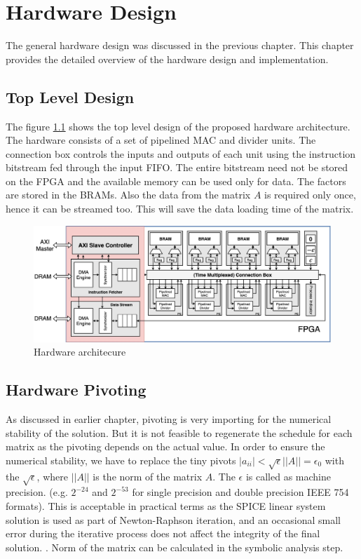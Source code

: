 \chapter{Hardware Design}

The general hardware design was discussed in the previous chapter. This chapter
provides the detailed overview of the hardware design and implementation.


\section{Top Level Design}
The figure \ref{fig:hw:top} shows the top level design of the proposed hardware architecture.
The hardware consists of a set of pipelined MAC and divider units. The connection box
controls the inputs and outputs of each unit using the instruction bitstream fed 
through the input FIFO. The entire bitstream need not be stored on the FPGA and the 
available memory can be used only for data. The factors are stored in the BRAMs. Also the data from the matrix $A$ is
required only once, hence it can be streamed too. This will save the data loading
time of the matrix. 

\begin{figure}
    \centering
    \includegraphics[width = \textwidth]{./Hardware/Hardware.jpg}
    \caption{Hardware architecure}
    \label{fig:hw:top}
\end{figure}


\section{Hardware Pivoting}

As discussed in earlier chapter, pivoting is very importing for the numerical
stability of the solution. But it is not feasible to regenerate the schedule 
for each matrix as the pivoting depends on the actual value. In order to ensure 
the numerical stability, we have to replace the tiny pivots 
$|a_{ii}| < \sqrt{\epsilon}||A|| = \epsilon_0$ with the $\sqrt{\epsilon}$, where $||A||$ is the norm 
of the matrix $A$. The $\epsilon$ is called as machine precision.
(e.g. $2^{-24}$ and $2^{-53}$ for single precision and double precision IEEE 754 formats).
This is acceptable in practical terms as the SPICE linear system solution is used as part of Newton-Raphson
iteration, and an occasional small error during the iterative process does not affect the integrity of the
final solution. \cite{machinePrecision}. Norm of the matrix can be calculated in the 
symbolic analysis step.

